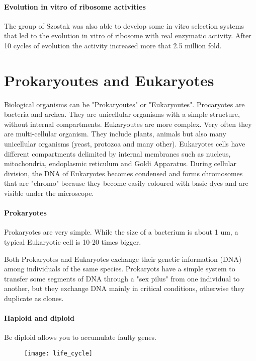 \paragraph*{Evolution in vitro of ribosome activities}
The group of Szostak was also able to develop some in vitro selection systems
that led to the evolution in vitro of ribosome with real enzymatic activity.
After 10 cycles of evolution the activity increased more that 2.5 million fold.

\section{Prokaryoutes and Eukaryotes}
Biological organisms can be "Prokaryoutes" or "Eukaryoutes". Procaryotes are
bacteria and archea. They are unicellular organisms with a simple structure,
without internal compartments. Eukaryoutes are more complex. Very often they are
multi-cellular organism. They include plants, animals but also many unicellular
organisms (yeast, protozoa and many other). Eukaryotes cells have different
compartments delimited by internal membranes such as nucleus, mitochondria,
endoplasmic reticulum and Goldi Apparatus. During cellular division, the DNA
of Eukaryotes becomes condensed and forms chromosomes that are "chromo" because
they become easily coloured with basic dyes and are visible under the
microscope.

\paragraph*{Prokaryotes} Prokaryotes are very simple. While the size of a
bacterium is about 1 um, a typical Eukaryotic cell is 10-20 times bigger.

Both Prokaryotes and Eukaryotes exchange their genetic information (DNA)
among individuals of the same species. Prokaryots have a simple system to
transfer some segments of DNA through a "sex pilus" from one individual to
another, but they exchange DNA mainly in critical conditions, otherwise they
duplicate as clones.

\paragraph*{Haploid and diploid}
Be diploid allows you to accumulate faulty genes.

\begin{figure}[H]
  \centering
  \texttt{[image: life\_cycle]}
\end{figure}

